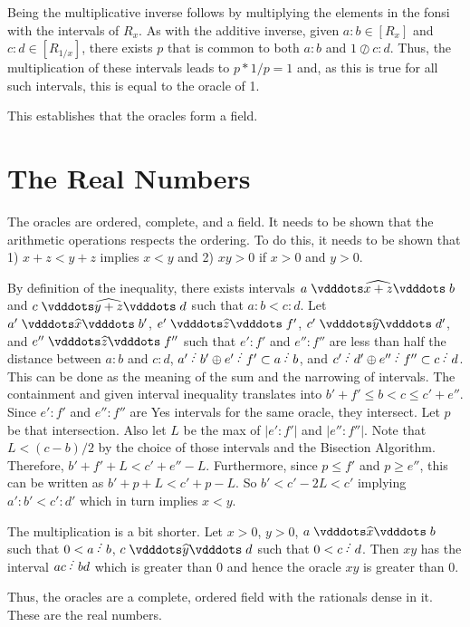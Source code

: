 \documentclass[12pt]{article}
\begin{document}
\begin{enumerate}
    Being the multiplicative inverse follows by multiplying the elements in the fonsi with the intervals of $R_x$. As with the additive inverse, given $a:b \in [R_x]$ and $c:d \in [R_{1/x}]$, there exists $p$ that is common to both $a:b$ and $1 \oslash c:d$. Thus, the multiplication of these intervals leads to $p *1/p = 1$ and, as this is true for all such intervals, this is equal to the oracle of 1. 

\end{enumerate}

This establishes that the oracles form a field. 


\section{The Real Numbers}

The oracles are ordered, complete, and a field. It needs to be shown that the arithmetic operations respects the ordering. To do this, it needs to be shown that 1) $x + z < y +z$ implies $x<y$ and 2) $xy > 0 $ if $x >0 $ and $y >0$.

By definition of the inequality, there exists intervals $ a \xora[x+z] b$ and $c \xora[y + z] d$ such that $a:b < c:d$. Let $a' \xora b'$, $e' \xora[z] f'$, $c' \xora[y] d'$, and $e''  \xora[z] f''$ such that $e':f'$ and $e'':f''$ are less than half the distance between $a:b$ and $c:d$, $a'\lte b'\oplus e' \lte f' \subset a \lte b$, and $c' \lte d' \oplus e'' \lte f'' \subset c \lte d$. This can be done as the meaning of the sum and the narrowing of intervals.  The containment and given interval inequality translates into $b' + f' \leq b < c \leq c' + e''$. Since $e':f'$ and $e'':f''$ are Yes intervals for the same oracle, they intersect. Let $p$ be that intersection. Also let $L$ be the max of $|e':f'|$ and $|e'':f''|$. Note that $L < (c-b)/2$ by the choice of those intervals and the Bisection Algorithm. Therefore, $b' + f' + L < c' + e'' - L $. Furthermore, since $p \leq f'$ and $p \geq e''$, this can be written as $b' + p + L <  c' + p - L$. So $b' < c' - 2L < c'$ implying $a':b' < c':d'$ which in turn implies $x< y$.

The multiplication is a bit shorter. Let $x >0 $, $y >0$, $a \xora b$ such that $0<a \lte b$, $c \xora[y] d$ such that $0 < c \lte d$. Then $xy$ has the interval $ac \lte bd$ which is greater than 0 and hence the oracle $xy$ is greater than 0. 

Thus, the oracles are a complete, ordered field with the rationals dense in it. These are the real numbers. 
\end{document}

